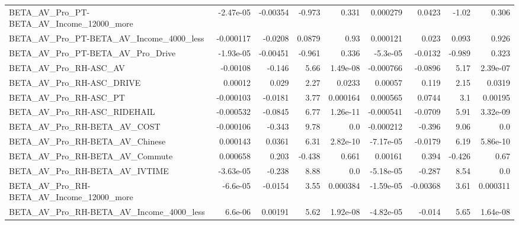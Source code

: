 \begin{tabular}{lrrrrrrrr}
BETA\_AV\_Pro\_PT-BETA\_AV\_Income\_12000\_more           &   -2.47e-05 &     -0.00354 &    -0.973 &    0.331 &   0.000279 &      0.0423 &        -1.02 &         0.306 \\
BETA\_AV\_Pro\_PT-BETA\_AV\_Income\_4000\_less            &   -0.000117 &      -0.0208 &    0.0879 &     0.93 &   0.000121 &       0.023 &        0.093 &         0.926 \\
BETA\_AV\_Pro\_PT-BETA\_AV\_Pro\_Drive                   &   -1.93e-05 &     -0.00451 &    -0.961 &    0.336 &   -5.3e-05 &     -0.0132 &       -0.989 &         0.323 \\
BETA\_AV\_Pro\_RH-ASC\_AV                              &    -0.00108 &       -0.146 &      5.66 & 1.49e-08 &  -0.000766 &     -0.0896 &         5.17 &      2.39e-07 \\
BETA\_AV\_Pro\_RH-ASC\_DRIVE                           &     0.00012 &        0.029 &      2.27 &   0.0233 &    0.00057 &       0.119 &         2.15 &        0.0319 \\
BETA\_AV\_Pro\_RH-ASC\_PT                              &   -0.000103 &      -0.0181 &      3.77 & 0.000164 &   0.000565 &      0.0744 &          3.1 &       0.00195 \\
BETA\_AV\_Pro\_RH-ASC\_RIDEHAIL                        &   -0.000532 &      -0.0845 &      6.77 & 1.26e-11 &  -0.000541 &     -0.0709 &         5.91 &      3.32e-09 \\
BETA\_AV\_Pro\_RH-BETA\_AV\_COST                        &   -0.000106 &       -0.343 &      9.78 &      0.0 &  -0.000212 &      -0.396 &         9.06 &           0.0 \\
BETA\_AV\_Pro\_RH-BETA\_AV\_Chinese                     &    0.000143 &       0.0361 &      6.31 & 2.82e-10 &  -7.17e-05 &     -0.0179 &         6.19 &      5.86e-10 \\
BETA\_AV\_Pro\_RH-BETA\_AV\_Commute                     &    0.000658 &        0.203 &    -0.438 &    0.661 &    0.00161 &       0.394 &       -0.426 &          0.67 \\
BETA\_AV\_Pro\_RH-BETA\_AV\_IVTIME                      &   -3.63e-05 &       -0.238 &      8.88 &      0.0 &  -5.18e-05 &      -0.287 &         8.54 &           0.0 \\
BETA\_AV\_Pro\_RH-BETA\_AV\_Income\_12000\_more           &    -6.6e-05 &      -0.0154 &      3.55 & 0.000384 &  -1.59e-05 &    -0.00368 &         3.61 &      0.000311 \\
BETA\_AV\_Pro\_RH-BETA\_AV\_Income\_4000\_less            &     6.6e-06 &      0.00191 &      5.62 & 1.92e-08 &  -4.82e-05 &      -0.014 &         5.65 &      1.64e-08 \\

\end{tabular}
